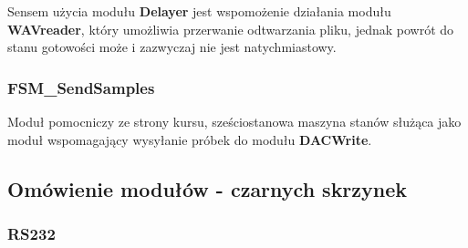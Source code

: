 \documentclass{article}
\begin{document}
Sensem użycia modułu \textbf{Delayer} jest wspomożenie działania modułu \textbf{WAVreader}, który umożliwia przerwanie odtwarzania pliku, jednak powrót do stanu gotowości może i zazwyczaj nie jest natychmiastowy. 

\subsubsection{FSM\_SendSamples}

\begin{figure}[H]
    \centering
\end{figure}



Moduł pomocniczy ze strony kursu, sześciostanowa maszyna stanów służąca jako moduł wspomagający wysyłanie próbek do modułu \textbf{DACWrite}.

\subsection{Omówienie modułów - czarnych skrzynek} %

\subsubsection{RS232}
\end{document}
